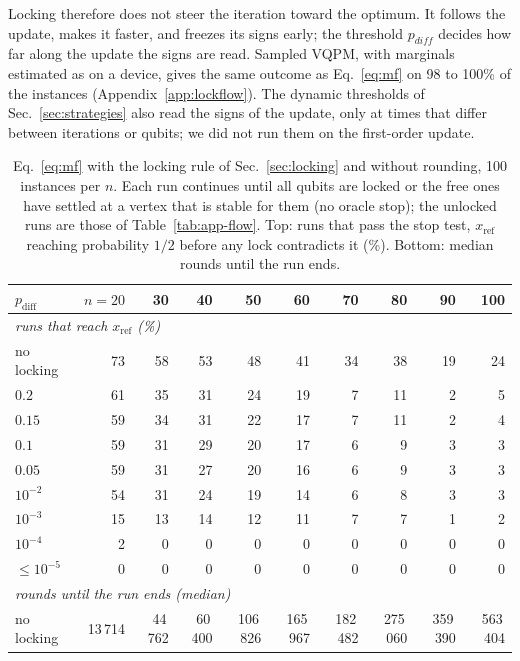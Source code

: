 \documentclass[onecolumn,10pt]{article}
\theoremstyle{remark}
\theoremstyle{plain}
\begin{document}
Locking therefore does not steer the iteration toward the optimum. It follows the update, makes it faster, and freezes its signs early; the threshold $p_{diff}$ decides how far along the update the signs are read. Sampled VQPM, with marginals estimated as on a device, gives the same outcome as Eq.~\eqref{eq:mf} on 98 to 100\% of the instances (Appendix~\ref{app:lockflow}). The dynamic thresholds of Sec.~\ref{sec:strategies} also read the signs of the update, only at times that differ between iterations or qubits; we did not run them on the first-order update.

\begin{table}[ht]
\centering
\small
\setlength{\tabcolsep}{4pt}
\caption{Eq.~\eqref{eq:mf} with the locking rule of Sec.~\ref{sec:locking} and without rounding, 100 instances per $n$. Each run continues until all qubits are locked or the free ones have settled at a vertex that is stable for them (no oracle stop); the unlocked runs are those of Table~\ref{tab:app-flow}. Top: runs that pass the stop test, $x_{\mathrm{ref}}$ reaching probability $1/2$ before any lock contradicts it (\%). Bottom: median rounds until the run ends.}
\label{tab:app-lockflow}
\begin{tabular}{lrrrrrrrrr}
\toprule
$p_{\mathrm{diff}}$ & $n=20$ & 30 & 40 & 50 & 60 & 70 & 80 & 90 & 100 \\
\midrule
\multicolumn{10}{l}{\emph{runs that reach $x_{\mathrm{ref}}$ (\%)}} \\
no locking & 73 & 58 & 53 & 48 & 41 & 34 & 38 & 19 & 24 \\
$0.2$ & 61 & 35 & 31 & 24 & 19 & 7 & 11 & 2 & 5 \\
$0.15$ & 59 & 34 & 31 & 22 & 17 & 7 & 11 & 2 & 4 \\
$0.1$ & 59 & 31 & 29 & 20 & 17 & 6 & 9 & 3 & 3 \\
$0.05$ & 59 & 31 & 27 & 20 & 16 & 6 & 9 & 3 & 3 \\
$10^{-2}$ & 54 & 31 & 24 & 19 & 14 & 6 & 8 & 3 & 3 \\
$10^{-3}$ & 15 & 13 & 14 & 12 & 11 & 7 & 7 & 1 & 2 \\
$10^{-4}$ & 2 & 0 & 0 & 0 & 0 & 0 & 0 & 0 & 0 \\
$\le10^{-5}$ & 0 & 0 & 0 & 0 & 0 & 0 & 0 & 0 & 0 \\
\midrule
\multicolumn{10}{l}{\emph{rounds until the run ends (median)}} \\
no locking & 13\,714 & 44\,762 & 60\,400 & 106\,826 & 165\,967 & 182\,482 & 275\,060 & 359\,390 & 563\,404 \\

\end{tabular}
\end{table}
\end{document}
